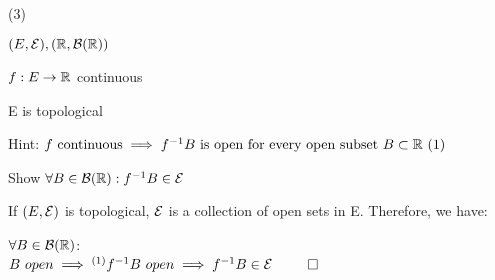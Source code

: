 (3)

\def\br{\borel{(\R)}}

$(E, \cal{E}), (\mathbb{R}, \mathcal{B}{(\mathbb{R})})$

$ f: E \rightarrow \mathbb{R} $ continuous

E is topological

Hint: $f \text{ continuous} \implies \finv{B} \text{ is open for every open subset } B \subset \R \ (1)$

Show $\forall B \in \mathcal{B}{(\mathbb{R})}: f^{-1} B \in \cal{E} $

If $(E, \cal{E})$ is topological, $\cal{E}$ is a collection of open sets in E. Therefore, we have:

$\forall B \in \br$: \\
$ B \ open \implies^{(1)} f^{-1} B \ open \implies f^{-1} B \in \cal{E} $
$\qed$